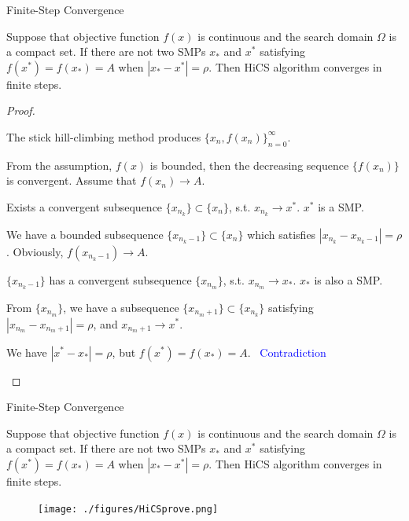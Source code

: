 \documentclass{beamer}
\begin{document}
\begin{frame}{Finite-Step Convergence}

\footnotesize{
\begin{theorem}
	Suppose that objective function $f(x)$ is continuous and the
	search domain $\Omega$ is a compact set.
	If there are not two SMPs $x_*$ and $x^*$ satisfying
	$f(x^*)=f(x_*)=A$ when $|x_*-x^*|=\rho$.
	Then HiCS algorithm converges in finite steps.
\end{theorem}
}
\pause
\begin{proof}
\begin{itemize}
\footnotesize{
	\item The stick hill-climbing method produces $\{x_n,
		f(x_n)\}_{n=0}^{\infty}$.
	\item From the assumption, $f(x)$ is bounded, then
		the decreasing sequence $\{f(x_n)\}$ is convergent.
		Assume that $f(x_n)\rightarrow A$.
	\item Exists a convergent subsequence $\{x_{n_k}\}\subset
		\{x_n\}$, s.t.  $x_{n_k}\rightarrow x^*$. $x^*$ is a
		SMP.
	\item We have a bounded subsequence
		$\{x_{n_{k}-1}\}\subset \{x_n\}$ which satisfies
		$|x_{n_k}-x_{n_{k}-1}|=\rho$. Obviously,
		$f(x_{{n_k}-1})\rightarrow A$.
	\item $\{x_{n_{k}-1}\}$ has a
		convergent subsequence $\{x_{n_{m}}\}$, s.t.
		$x_{n_{m}}\rightarrow x_*$. $x_*$ is also a SMP.
	\item From $\{x_{n_{m}}\}$, we have a subsequence
		$\{x_{n_{m}+1}\}\subset\{ x_{n_k}\}$ satisfying
		$|x_{n_m}-x_{n_{m}+1}|=\rho$, and $x_{{n_m}+1}\rightarrow x^*$.
	\item We have $|x^* - x_*|=\rho$, but $f(x^*)=f(x_*)=A$.
		\pause
		~\textcolor{blue}{Contradiction}
		}
\end{itemize}
\end{proof}

\end{frame}

\begin{frame}{Finite-Step Convergence}

\footnotesize{
\begin{theorem}
	Suppose that objective function $f(x)$ is continuous and the
	search domain $\Omega$ is a compact set.
	If there are not two SMPs $x_*$ and $x^*$ satisfying
	$f(x^*)=f(x_*)=A$ when $|x_*-x^*|=\rho$.
	Then HiCS algorithm converges in finite steps.
\end{theorem}
}
\begin{figure}[!htbp]
	\centering
	  \texttt{[image: ./figures/HiCSprove.png]}
\end{figure}

\end{frame}
\end{document}
